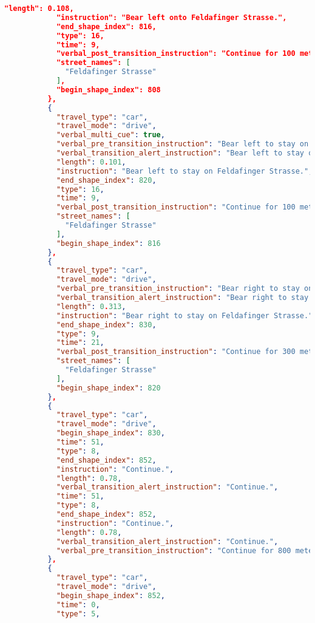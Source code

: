 \begin{lstlisting}[language=json,breaklines=true]
            "length": 0.108,
            "instruction": "Bear left onto Feldafinger Strasse.",
            "end_shape_index": 816,
            "type": 16,
            "time": 9,
            "verbal_post_transition_instruction": "Continue for 100 meters.",
            "street_names": [
              "Feldafinger Strasse"
            ],
            "begin_shape_index": 808
          },
          {
            "travel_type": "car",
            "travel_mode": "drive",
            "verbal_multi_cue": true,
            "verbal_pre_transition_instruction": "Bear left to stay on Feldafinger Strasse. Then Bear right to stay on Feldafinger Strasse.",
            "verbal_transition_alert_instruction": "Bear left to stay on Feldafinger Strasse.",
            "length": 0.101,
            "instruction": "Bear left to stay on Feldafinger Strasse.",
            "end_shape_index": 820,
            "type": 16,
            "time": 9,
            "verbal_post_transition_instruction": "Continue for 100 meters.",
            "street_names": [
              "Feldafinger Strasse"
            ],
            "begin_shape_index": 816
          },
          {
            "travel_type": "car",
            "travel_mode": "drive",
            "verbal_pre_transition_instruction": "Bear right to stay on Feldafinger Strasse.",
            "verbal_transition_alert_instruction": "Bear right to stay on Feldafinger Strasse.",
            "length": 0.313,
            "instruction": "Bear right to stay on Feldafinger Strasse.",
            "end_shape_index": 830,
            "type": 9,
            "time": 21,
            "verbal_post_transition_instruction": "Continue for 300 meters.",
            "street_names": [
              "Feldafinger Strasse"
            ],
            "begin_shape_index": 820
          },
          {
            "travel_type": "car",
            "travel_mode": "drive",
            "begin_shape_index": 830,
            "time": 51,
            "type": 8,
            "end_shape_index": 852,
            "instruction": "Continue.",
            "length": 0.78,
            "verbal_transition_alert_instruction": "Continue.",
            "time": 51,
            "type": 8,
            "end_shape_index": 852,
            "instruction": "Continue.",
            "length": 0.78,
            "verbal_transition_alert_instruction": "Continue.",
            "verbal_pre_transition_instruction": "Continue for 800 meters."
          },
          {
            "travel_type": "car",
            "travel_mode": "drive",
            "begin_shape_index": 852,
            "time": 0,
            "type": 5,

\end{lstlisting}
